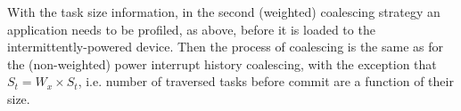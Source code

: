 With the task size information, in the second (weighted) coalescing strategy an application needs to be profiled, as above, before it is loaded to the intermittently-powered device. Then the process of coalescing is the same as for the (non-weighted) power interrupt history coalescing, with the exception that $S_t=W_x \times S_t$, i.e. number of traversed tasks before commit are a function of their size.


